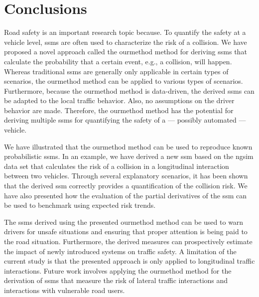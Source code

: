 \section{Conclusions}
\label{sec:conclusions}

Road safety is an important research topic because.
To quantify the safety at a vehicle level, \acp{ssm} are often used to characterize the risk of a collision. 
\cstarta We have proposed a novel approach called the \ac{ourmethod} method for deriving \acp{ssm} that calculate the probability that a certain event, e.g., a collision, will happen. 
Whereas traditional \acp{ssm} are generally only applicable in certain types of scenarios, the \ac{ourmethod} method can be applied to various types of scenarios.
Furthermore, because the \ac{ourmethod} method is data-driven, the derived \acp{ssm} can be adapted to the local traffic behavior. 
Also, no assumptions on the driver behavior are made.
Therefore, the \ac{ourmethod} method has the potential for deriving multiple \acp{ssm} for quantifying the safety of a --- possibly automated --- vehicle.

We have illustrated that the \ac{ourmethod} method can be used to reproduce known probabilistic \acp{ssm}.
In an example, we have derived a new \ac{ssm} based on the \ac{ngsim} data set that calculates the risk of a collision in a longitudinal interaction between two vehicles.
Through several explanatory scenarios, it has been shown that the derived \ac{ssm} correctly provides a quantification of the collision risk.
We have also presented how the evaluation of the partial derivatives of the \ac{ssm} can be used to benchmark  using expected risk trends. \cenda

The \acp{ssm} derived using the presented \ac{ourmethod} method can be used to warn drivers for unsafe situations and ensuring that proper attention is being paid to the road situation.
Furthermore, the derived measures can \cstartc prospectively \cendc estimate the impact of newly introduced systems on traffic safety. 
A limitation of the current study is that the presented approach is only applied to longitudinal traffic interactions. 
\cstarta Future work involves applying the \ac{ourmethod} method for the derivation of \acp{ssm} that measure the risk of lateral traffic interactions and interactions with vulnerable road users. \cenda
